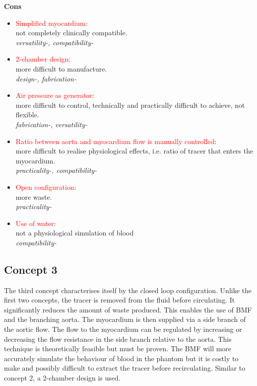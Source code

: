\begin{minipage}[t]{0.5\textwidth}
\centering\textbf{Cons}
\begin{itemize} [noitemsep]
	\item \textcolor{red}{Simplified myocardium}: \\ not completely clinically compatible. \\ \textit{versatility-, compatibility-}
	\item \textcolor{red}{2-chamber design}: \\ more difficult to manufacture. \\ \textit{design-, fabrication-}
	\item \textcolor{red}{Air pressure as generator}: \\ more difficult to control, technically and practically difficult to achieve, not flexible. \\ \textit{fabrication-, versatility-}
	\item \textcolor{red}{Ratio between aorta and myocardium flow is manually controlled}: \\ more difficult to realise physiological effects, i.e. ratio of tracer that enters the myocardium. \\ \textit{practicality-, compatibility-}
	\item \textcolor{red}{Open configuration}: \\ more waste. \\ \textit{practicality-}
	\item \textcolor{red}{Use of water}: \\ not a physiological simulation of blood \\ \textit{compatibility-}
\end{itemize}
\end{minipage}
\subsection{Concept 3}
The third concept characterises itself by the closed loop configuration. Unlike the first two concepts, the tracer is removed from the fluid before circulating. It significantly reduces the amount of waste produced. This enables the use of BMF and the branching aorta. The myocardium is then supplied via a side branch of the aortic flow. The flow to the myocardium can be regulated by increasing or decreasing the flow resistance in the side branch relative to the aorta. This technique is theoretically feasible but must be proven. The BMF will more accurately simulate the behaviour of blood in the phantom but it is costly to make and possibly difficult to extract the tracer before recirculating. Similar to concept 2, a 2-chamber design is used.

